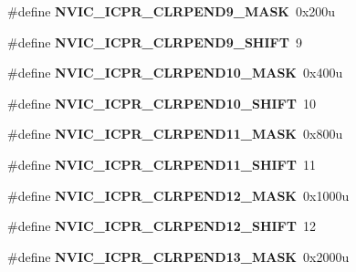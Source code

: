 \begin{DoxyCompactItemize}
\#define {\bfseries N\+V\+I\+C\+\_\+\+I\+C\+P\+R\+\_\+\+C\+L\+R\+P\+E\+N\+D9\+\_\+\+M\+A\+SK}~0x200u
\item 
\mbox{\label{group___n_v_i_c___register___masks_ga529e8cc2304d9cea0c3b6f8252eeac4a}} 
\#define {\bfseries N\+V\+I\+C\+\_\+\+I\+C\+P\+R\+\_\+\+C\+L\+R\+P\+E\+N\+D9\+\_\+\+S\+H\+I\+FT}~9
\item 
\mbox{\label{group___n_v_i_c___register___masks_gad27f8da139c67a8a3b93d443b641dd1d}} 
\#define {\bfseries N\+V\+I\+C\+\_\+\+I\+C\+P\+R\+\_\+\+C\+L\+R\+P\+E\+N\+D10\+\_\+\+M\+A\+SK}~0x400u
\item 
\mbox{\label{group___n_v_i_c___register___masks_gabca597cdbc52f88130ab13c72d047657}} 
\#define {\bfseries N\+V\+I\+C\+\_\+\+I\+C\+P\+R\+\_\+\+C\+L\+R\+P\+E\+N\+D10\+\_\+\+S\+H\+I\+FT}~10
\item 
\mbox{\label{group___n_v_i_c___register___masks_ga51b2644d6ade462bebaae249fe11f89b}} 
\#define {\bfseries N\+V\+I\+C\+\_\+\+I\+C\+P\+R\+\_\+\+C\+L\+R\+P\+E\+N\+D11\+\_\+\+M\+A\+SK}~0x800u
\item 
\mbox{\label{group___n_v_i_c___register___masks_gafc17410ea00dcbc753eb4f900edce1e1}} 
\#define {\bfseries N\+V\+I\+C\+\_\+\+I\+C\+P\+R\+\_\+\+C\+L\+R\+P\+E\+N\+D11\+\_\+\+S\+H\+I\+FT}~11
\item 
\mbox{\label{group___n_v_i_c___register___masks_ga9d5252287a925cac9af288dd64777004}} 
\#define {\bfseries N\+V\+I\+C\+\_\+\+I\+C\+P\+R\+\_\+\+C\+L\+R\+P\+E\+N\+D12\+\_\+\+M\+A\+SK}~0x1000u
\item 
\mbox{\label{group___n_v_i_c___register___masks_ga1c53ed4d054368298f6679a0428c9d75}} 
\#define {\bfseries N\+V\+I\+C\+\_\+\+I\+C\+P\+R\+\_\+\+C\+L\+R\+P\+E\+N\+D12\+\_\+\+S\+H\+I\+FT}~12
\item 
\mbox{\label{group___n_v_i_c___register___masks_ga7020b8593e10611a356e186f27203236}} 
\#define {\bfseries N\+V\+I\+C\+\_\+\+I\+C\+P\+R\+\_\+\+C\+L\+R\+P\+E\+N\+D13\+\_\+\+M\+A\+SK}~0x2000u

\end{DoxyCompactItemize}
